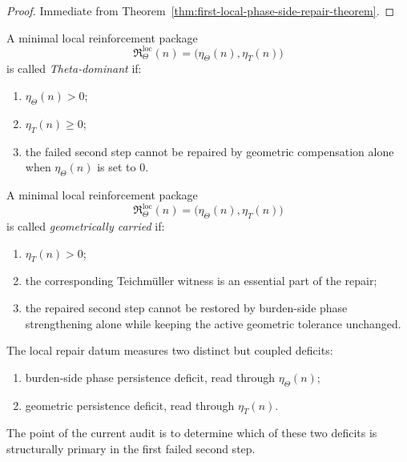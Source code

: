 \begin{proof}
Immediate from Theorem~\ref{thm:first-local-phase-side-repair-theorem}.
\end{proof}


\begin{definition}
\label{def:theta-dominant-local-repair}
A minimal local reinforcement package
\[
\mathfrak{R}_{\Theta}^{\mathrm{loc}}(n)
=
\bigl(
\eta_{\Theta}(n),
\eta_{T}(n)
\bigr)
\]
is called \emph{Theta-dominant} if:
\begin{enumerate}
 \item \(\eta_{\Theta}(n) > 0\);
 \item \(\eta_{T}(n)\ge 0\);
 \item the failed second step cannot be repaired by geometric compensation alone when \(\eta_{\Theta}(n)\) is set to \(0\).
\end{enumerate}
\end{definition}

\begin{definition}
\label{def:geometrically-carried-local-repair}
A minimal local reinforcement package
\[
\mathfrak{R}_{\Theta}^{\mathrm{loc}}(n)
=
\bigl(
\eta_{\Theta}(n),
\eta_{T}(n)
\bigr)
\]
is called \emph{geometrically carried} if:
\begin{enumerate}
 \item \(\eta_{T}(n) > 0\);
 \item the corresponding Teichm\"uller witness is an essential part of the repair;
 \item the repaired second step cannot be restored by burden-side phase strengthening alone while keeping the active geometric tolerance unchanged.
\end{enumerate}
\end{definition}

\begin{remark}
\label{rem:two-sided-reading-of-the-repair-datum}
The local repair datum measures two distinct but coupled deficits:
\begin{enumerate}
 \item burden-side phase persistence deficit, read through \(\eta_{\Theta}(n)\);
 \item geometric persistence deficit, read through \(\eta_{T}(n)\).
\end{enumerate}
The point of the current audit is to determine which of these two deficits is structurally primary in the first failed second step.
\end{remark}

